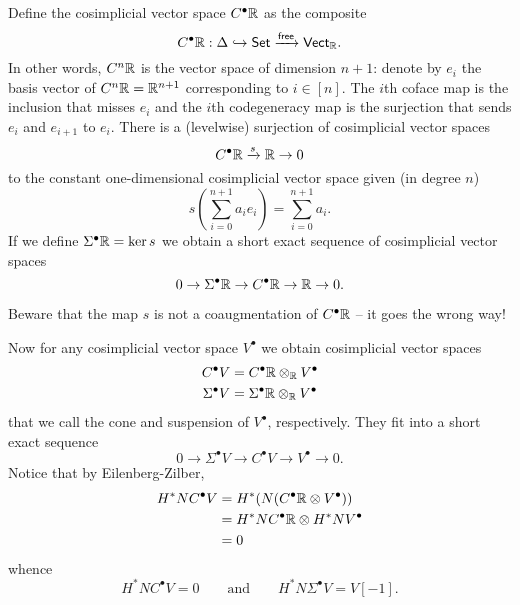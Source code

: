 \documentclass{amsart}
\begin{document}
\begin{definition}
    Define the cosimplicial vector space $C^\bullet\mathbb{R}$ as the composite
    \begin{equation*}
        C^\bullet\mathbb{R} : \Delta \hookrightarrow \mathsf{Set} 
        \xrightarrow{\mathsf{free}} \mathsf{Vect}_{\mathbb{R}}.
    \end{equation*}
    In other words, $C^n\mathbb{R}$ is the vector space of dimension $n+1$: denote by  
    $e_i$ the basis vector of $C^n\mathbb{R}=\mathbb{R}^{n+1}$ corresponding to $i\in [n]$. The 
    $i$th coface map is the inclusion that misses $e_i$ and the $i$th 
    codegeneracy map is the surjection that sends $e_i$ and $e_{i+1}$ to $e_i$.
    There is a (levelwise) surjection of cosimplicial vector spaces
    \begin{equation*}
        C^\bullet \mathbb{R} \xrightarrow{s} \mathbb{R} \to 0
    \end{equation*}
    to the constant one-dimensional cosimplicial vector space given (in degree 
    $n$)
    \begin{equation*}
        s\left( \sum_{i=0}^{n+1} a_i e_i \right) = \sum_{i=0}^{n+1} a_i.
    \end{equation*}
    If we define $\Sigma^\bullet \mathbb{R}=\ker s$ we obtain a short exact sequence of 
    cosimplicial vector spaces
    \begin{equation*}
        0 \to \Sigma^\bullet \mathbb{R} \to C^\bullet \mathbb{R} \to \mathbb{R} \to 0.
    \end{equation*}
\end{definition}

\begin{remark}
    Beware that the map $s$ is not a coaugmentation of $C^\bullet\mathbb{R}$ -- it
    goes the wrong way!
\end{remark}

Now for any cosimplicial vector space $V^\bullet$ we obtain cosimplicial vector 
spaces
\begin{align*}
    C^\bullet V &= C^\bullet\mathbb{R} \otimes_{\mathbb{R}} V^\bullet \\
    \Sigma^\bullet V &= \Sigma^\bullet \mathbb{R} \otimes_{\mathbb{R}} V^\bullet
\end{align*}
that we call the cone and suspension of $V^\bullet$, respectively.
They fit into a short exact sequence
\begin{equation*}
    0 \to \Sigma^\bullet V \to C^\bullet V \to V^\bullet \to 0.
\end{equation*}
Notice that by Eilenberg-Zilber,
\begin{align*}
    H^*NC^\bullet V &= H^*(N(C^\bullet\mathbb{R} \otimes V^\bullet)) \\
    &= H^*NC^\bullet\mathbb{R} \otimes H^*NV^\bullet \\
    &= 0
\end{align*}
whence
\begin{equation*}
    H^*NC^\bullet V = 0 \qquad \text{and} \qquad H^*N\Sigma^\bullet V=V[-1].
\end{equation*}
\end{document}
